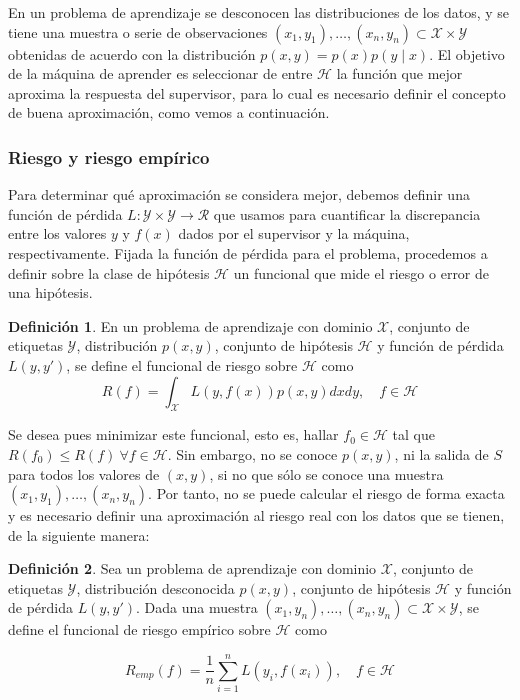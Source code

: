 \documentclass[a4paper,12pt]{report}
\theoremstyle{definition}
\newtheorem{dfn}{Definición}
\begin{document}
En un problema de aprendizaje se desconocen las distribuciones de los datos, y se tiene una muestra o serie de observaciones $(x_1, y_1), \dots , (x_n, y_n) \subset \mathcal{X} \times \mathcal{Y}$ obtenidas de acuerdo con la distribución $p(x,y) = p(x)p(y\mid x)$. El objetivo de la máquina de aprender es seleccionar de entre $\mathcal{H}$ la función que mejor aproxima la respuesta del supervisor, para lo cual es necesario definir el concepto de buena aproximación, como vemos a continuación.

\subsubsection{Riesgo y riesgo empírico}

Para determinar qué aproximación se considera mejor, debemos definir una función de pérdida $L : \mathcal{Y} \times \mathcal{Y} \rightarrow \mathcal{R}$ que usamos para cuantificar la discrepancia entre los valores $y$ y $f(x)$ dados por el supervisor y la máquina, respectivamente. Fijada la función de pérdida para el problema, procedemos a definir sobre la clase de hipótesis $\mathcal{H}$ un funcional que mide el riesgo o error de una hipótesis.

\begin{dfn}
  En un problema de aprendizaje con dominio $\mathcal{X}$, conjunto de etiquetas $\mathcal{Y}$, distribución $p(x,y)$, conjunto de hipótesis $\mathcal{H}$ y función de pérdida $L(y, y')$, se define el funcional de riesgo sobre $\mathcal{H}$ como
  $$ R(f) = \int_{\mathcal{X}} L(y, f(x))p(x,y)dxdy , \quad f \in \mathcal{H}$$
\end{dfn}

Se desea pues minimizar este funcional, esto es, hallar $f_0 \in \mathcal{H}$ tal que
$ R(f_0) \leq R(f) \ \forall f \in \mathcal{H}$.
Sin embargo, no se conoce $p(x,y)$, ni la salida de $S$ para todos los valores de $(x,y)$, si no que sólo se conoce una muestra $(x_1,y_1), \ldots, (x_n,y_n)$. Por tanto, no se puede calcular el riesgo de forma exacta y es necesario definir una aproximación al riesgo real con los datos que se tienen, de la siguiente manera:

\begin{dfn}
  Sea un problema de aprendizaje con dominio $\mathcal{X}$, conjunto de etiquetas $\mathcal{Y}$, distribución desconocida $p(x,y)$, conjunto de hipótesis $\mathcal{H}$ y función de pérdida $L(y, y')$. Dada una muestra $(x_1, y_n) , \ldots, (x_n, y_n) \subset \mathcal{X} \times \mathcal{Y}$, se define el funcional de riesgo empírico sobre $\mathcal{H}$ como

  $$ R_{emp}(f) = \frac{1}{n} \sum_{i=1}^n L(y_i, f(x_i)), \quad f \in \mathcal{H}$$
\end{dfn}
\end{document}
